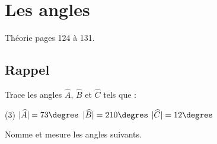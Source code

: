 \documentclass[../math2.tex]{subfiles}
\begin{document}
\setcounter{exercise}{0}

\chapter{Les angles}
 Théorie pages 124 à 131.
\section{Rappel}
\begin{exercise}
    Trace les angles $\widehat{A}$, $\widehat{B}$ et $\widehat{C}$ tels que :
    \begin{tasks}(3)
        \task $|\widehat{A}| = 73\degres$
        \task $|\widehat{B}| = 210\degres$
        \task $|\widehat{C}| = 12\degres$
    \end{tasks}
\end{exercise}
\vfill
\begin{exercise}
    Nomme et mesure les angles suivants.
    \begin{center}
        
    \end{center}
    \vspace*{2cm}
\end{exercise}
\newpage
\end{document}
